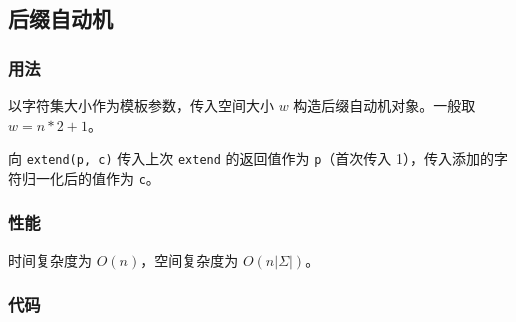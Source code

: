 \subsection{后缀自动机}

\subsubsection{用法}

以字符集大小作为模板参数，传入空间大小 $w$ 构造后缀自动机对象。一般取 $w = n * 2 + 1$。

向 \lstinline{extend(p, c)} 传入上次 \lstinline{extend} 的返回值作为 \lstinline{p}（首次传入 1），传入添加的字符归一化后的值作为 \lstinline{c}。

\subsubsection{性能}

时间复杂度为 $O(n)$，空间复杂度为 $O(n |\Sigma|)$。

\subsubsection{代码}



